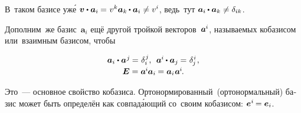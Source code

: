 \begin{otherlanguage}{russian}
В~таком базисе уж\'{е} ${\bm{v} \dotp \bm{a}_i \hspace{-0.1ex} = \hspace{0.1ex} v^{k} \bm{a}_k \hspace{-0.1ex} \dotp \bm{a}_i \neq\vspace{0.2ex} v^{i}}$\hspace{-0.25ex}, ведь~тут ${\bm{a}_i \hspace{-0.1ex} \dotp \bm{a}_k \neq\vspace{0.2ex} \delta_{ik}}$.

Дополним~же \hbox{базис}~${\bm{a}_i}$ ещё другой тройкой векторов~\hbox{${\bm{a}^{\hspace{-0.05ex}i}}$\hspace{-0.25ex},} \hbox{называемых} кобазисом или~взаимным базисом, чтобы

\nopagebreak\vspace{-0.2em}\begin{equation}\label{fundamentalpropertyofcobasis}
\begin{array}{c}
\bm{a}_i \dotp \bm{a}^{\hspace{0.1ex}j} \hspace{-0.1ex} = \hspace{0.1ex} \delta_i^{\hspace{0.1ex}j} , \:\:
\bm{a}^{\hspace{-0.05ex}i} \hspace{-0.1ex} \dotp \bm{a}_j \hspace{-0.1ex} = \hspace{0.1ex} \delta_{\hspace{-0.1ex}j}^{\hspace{0.1ex}i} \hspace{0.16ex}, \\[0.2em]
\bm{E} = \bm{a}^{\hspace{-0.1ex}i} \hspace{-0.1ex} \bm{a}_i \hspace{-0.1ex} = \bm{a}_i \hspace{0.1ex} \bm{a}^{\hspace{-0.1ex}i} \hspace{-0.2ex}.
\end{array}
\end{equation}

\vspace{-0.1em}\noindent Это~--- основное свойство кобазиса. Орто\-нормирован\-ный~(орто\-нормаль\-ный) базис может быть определён как совпад\'{а}ющий со~своим кобазисом: ${\bm{e}^{\hspace{0.05ex}i} \hspace{-0.2ex} = \bm{e}_{i}}$.


\end{otherlanguage}
